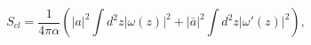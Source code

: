 \begin{equation}
\label{action}
S_{cl}=\frac{1}{4 \pi \alpha}\left( |a|^{2}\int d^{2}z |\omega(z)|^{2}
  +|\bar{a}|^{2}\int d^{2}z |\omega'(z)|^{2} \right),
\end{equation}

